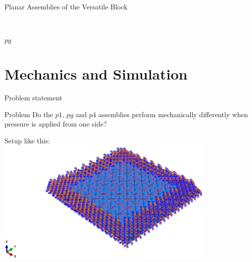 \documentclass{beamer}
\numberwithin{equation}{aufgabe}
\begin{document}
\begin{frame}{Planar Assemblies of the Versatile Block}
\begin{center}
{{            }
            \\ \begin{center}
                $pg$
            \end{center}
        }
    \end{center}
\end{frame}

\section{Mechanics and Simulation}
\begin{frame}{Problem statement}
    \begin{exampleblock}{Problem}
        Do the $p1$, $pg$ and $p4$ assemblies perform mechanically differently when pressure is applied from one side?\\
    \end{exampleblock}
    \pause
    Setup like this:\\
    \includegraphics[width=0.8\textwidth]{images/setup-10x10.png}
\end{frame}
\end{document}
